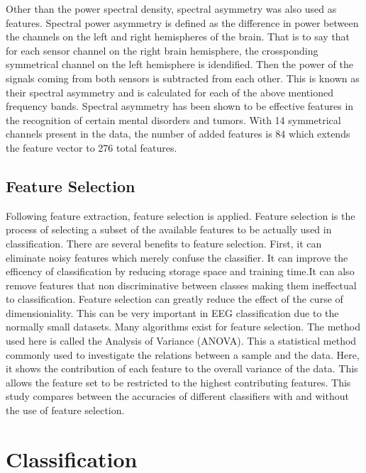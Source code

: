 \documentclass[12pt, a4paper, fleqn]{memoir}%
\begin{document}
Other than the power spectral density, spectral asymmetry was also used as features. Spectral power asymmetry is defined as the difference in power between the channels on the left and right hemispheres of the brain. That is to say that for each sensor channel on the right brain hemisphere, the crossponding symmetrical channel on the left hemisphere is idendified. Then the power of the signals coming from both sensors is subtracted from each other. This is known as their spectral asymmetry and is calculated for each of the above mentioned frequency bands. Spectral asymmetry has been shown to be effective features in the recognition of certain mental disorders and tumors. With 14 symmetrical channels present in the data, the number of added features is 84 which extends the feature vector to 276 total features.

\section{Feature Selection}
\label{sec:FeatureSelection}
Following feature extraction, feature selection is applied. Feature selection is the process of selecting a subset of the available features to be actually used in classification. There are several benefits to feature selection. First, it can eliminate noisy features which merely confuse the classifier. It can improve the efficency of classification by reducing storage space and training time.It can also remove features that non discriminative between classes making them ineffectual to classification. Feature selection can greatly reduce the effect of the curse of dimensioniality. This can be very important in EEG classification due to the normally small datasets. Many algorithms exist for feature selection. The method used here is called the Analysis of Variance (ANOVA). This a statistical method commonly used to investigate the relations between a sample and the data. Here, it shows the contribution of each feature to the overall variance of the data. This allows the feature set to be restricted to the highest contributing features. This study compares between the accuracies of different classifiers with and without the use of feature selection.
\chapter{Classification}
\label{chap:Classification}
\end{document}
